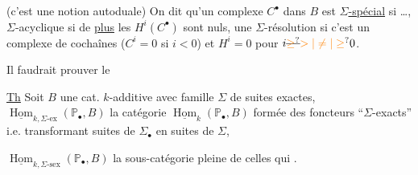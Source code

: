 
(c'est une notion autoduale) On dit qu'un complexe $C^{\bullet}$ dans $B$ est \uline{$\Sigma$-spécial} si …, $\Sigma$-acyclique si de \uline{plus} les $H^i(C^{\bullet})$ sont nuls, une $\Sigma$-résolution si c'est un complexe de cochaînes ($C^i=0$ si $i<0$) et $H^i=0$ pour $i\deleted{\unsure{\geq}}\unsure{>|\neq|\geq}0$.


Il faudrait prouver le

\margin{!}

\uline{Th} Soit $B$ une cat.  $k$-additive avec famille $\Sigma$ de suites exactes,  $\underline{\operatorname{Hom}}_{k,\Sigma\text{-}\mathrm{ex}}(\mathbb P_{\bullet},B)$ la catégorie  $\underline{\operatorname{Hom}}_k(\mathbb P_{\bullet},B)$ formée des foncteurs ``$\Sigma$-exacts'' i.e. transformant suites de $\Sigma_{\bullet}$ en suites de $\Sigma$,


  $\underline{\operatorname{Hom}}_{k,\Sigma\text{-}\mathrm{sex}}(\mathbb P_{\bullet},B)$ la sous-catégorie pleine de celles qui . 

